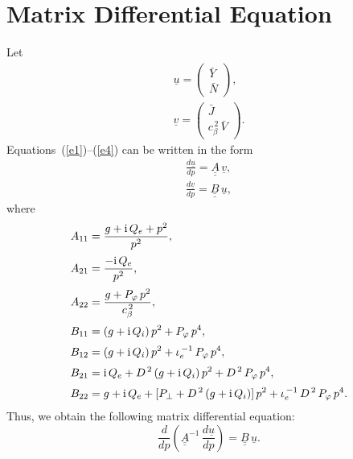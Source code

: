 \documentclass[12pt,prb,aps,notitlepage]{revtex4-1}
\begin{document}
\section{Matrix Differential Equation}
Let
\begin{align}
\underline{u}= \left(\begin{array}{c}\bar{Y}\\\bar{N}\end{array}\right),\\[0.5ex]
\underline{v}= \left(\begin{array}{c}\bar{J}\\c_\beta^{\,2}\,\bar{V}\end{array}\right).
\end{align}
Equations~(\ref{e1})--(\ref{e4}) can be written in the form 
\begin{align}
\frac{d\underline{u}}{dp}= \underline{\underline{A}}\,\underline{v},\\[0.5ex]
\frac{d\underline{v}}{dp}= \underline{\underline{B}}\,\underline{u},
\end{align}
where
\begin{align}
A_{11} &=  \frac{g+{\rm i}\,Q_e+p^2}{p^2},\\[0.5ex]
A_{21} &= \frac{-{\rm i}\,Q_e}{p^2},\\[0.5ex]
A_{22} &= \frac{g + P_\varphi\,p^2}{c_\beta^{\,2}},\\[0.5ex]
B_{11} &= (g+{\rm i}\,Q_i)\,p^2 + P_\varphi\,p^4,\\[0.5ex]
B_{12} &= (g+{\rm i}\,Q_i)\,p^2 + \iota_e^{\,-1}\,P_\varphi\,p^4,\\[0.5ex]
B_{21}&= {\rm i}\,Q_e+ D^{\,2}\,(g+{\rm i}\,Q_i)\,p^2 + D^{\,2}\,P_\varphi\,p^4,\\[0.5ex]
B_{22} & =g+{\rm i}\,Q_e + [P_\perp + D^{\,2}\,(g + {\rm i}\,Q_i)]\,p^2 + \iota_e^{\,-1}\,D^{\,2}\,P_\varphi\,p^4.
\end{align}
Thus, we obtain the following matrix differential equation: 
\begin{equation}\label{mat}
\frac{d}{dp}\!\left(\underline{\underline{A}}^{-1}\,\frac{d\underline{u}}{dp}\right) = \underline{\underline{B}}\,\underline{u}.
\end{equation}
\end{document}

